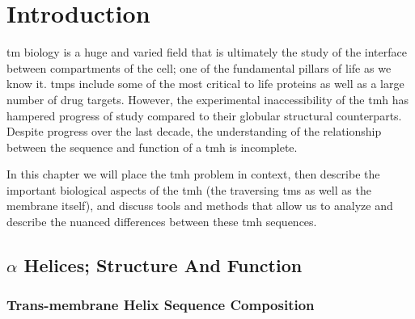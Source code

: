\chapter{Introduction}

\gls{tm} biology is a huge and varied field  that is ultimately the study of the interface between compartments of the cell; one of the fundamental pillars of life as we know it. \gls{tmp}s include some of the most critical to life proteins as well as a large number of drug targets.
However, the experimental inaccessibility of the \gls{tmh} has hampered progress of study compared to their globular structural counterparts. Despite progress over the last decade, the understanding of the relationship between the sequence and function of a \gls{tmh} is incomplete.

In this chapter we will place the \gls{tmh} problem in context, then describe the important biological aspects of the \gls{tmh} (the traversing \gls{tms} as well as the membrane itself), and discuss tools and methods that allow us to analyze and describe the nuanced differences between these \gls{tmh} sequences.

\section{$\alpha$ Helices; Structure And Function}

\subsection{Trans-membrane Helix Sequence Composition}

